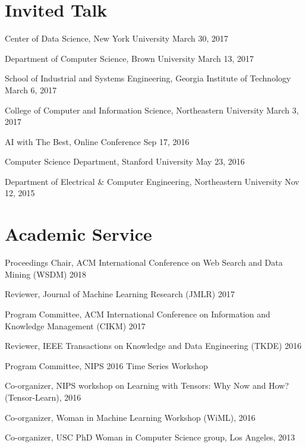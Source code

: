 \documentclass[margin,line]{res}
\begin{document}
\begin{resume}

\section{\sc Invited Talk}

Center of Data Science, New York University  \hfill {March 30, 2017}


Department of Computer Science, Brown University   \hfill {March 13, 2017}



School of Industrial and Systems Engineering, Georgia Institute of Technology  \hfill {March 6, 2017}


College of Computer and Information Science, Northeastern University  \hfill {March 3, 2017}


 
 AI with The Best, Online Conference \hfill {Sep 17, 2016}
 
 
Computer Science Department,  Stanford University  \hfill {May 23, 2016}
 
 
Department of  Electrical \& Computer Engineering,  Northeastern University  \hfill {Nov 12, 2015}



\section{\sc Academic Service}
Proceedings Chair,  ACM International Conference on Web Search and Data Mining (WSDM) 2018

Reviewer,  Journal of Machine Learning Research (JMLR) 2017

Program Committee, ACM International Conference on Information and Knowledge Management (CIKM)  2017

Reviewer, IEEE Transactions on Knowledge and Data Engineering (TKDE) 2016

Program Committee, NIPS 2016 Time Series Workshop

Co-organizer, NIPS workshop on Learning with Tensors: Why Now and How? (Tensor-Learn), 2016


Co-organizer, Woman in Machine Learning Workshop (WiML), 2016

Co-organizer, USC PhD Woman in Computer Science group, Los Angeles, 2013


\end{resume}
\end{document}
